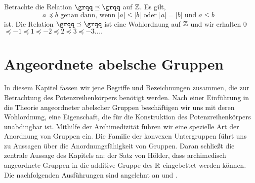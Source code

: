 %

%
%
\begin{bsp}
Betrachte die Relation $\grqq\preceq \grqq $ auf $\mathbb{Z}$. Es gilt,  
\[a \preceq b \text{ genau dann, wenn } |a| \le |b| \text{ oder }  |a| = |b| \text{ und } a \leq  b\]
ist.
Die Relation $\grqq\preceq \grqq $ ist eine Wohlordnung auf $\mathbb{Z}$ und wir erhalten 0$  \preceq -1 \preceq 1 \preceq -2 \preceq 2 \preceq 3 \preceq -3 .... $ 
\end{bsp}
%

%
 
\chapter{Angeordnete abelsche Gruppen}\label{chap2} %
In diesem Kapitel fassen wir jene Begriffe und Bezeichnungen zusammen, die zur Betrachtung des Potenzreihenkörpers benötigt werden. Nach einer Einführung in die Theorie angeordneter abelscher Gruppen beschäftigen wir uns mit deren Wohlordnung, eine Eigenschaft, die für die Konstruktion des Potenzreihenkörpers unabdingbar ist. Mithilfe der Archimedizität führen wir eine spezielle Art der Anordnung von Gruppen ein. Die Familie der konvexen Untergruppen führt uns zu Aussagen über die Anordnungsfähigkeit von Gruppen. Daran schließt die zentrale Aussage des Kapitels an: der Satz von Hölder, dass archimedisch angeordnete Gruppen in die additive Gruppe des $\mathbb{R}$ eingebettet werden können. \\
Die nachfolgenden Ausführungen sind angelehnt an \cite[S. 21 - 28]{fuchs66} und \cite[S. 1 -  4]{priesscrampe83}.
%
%

